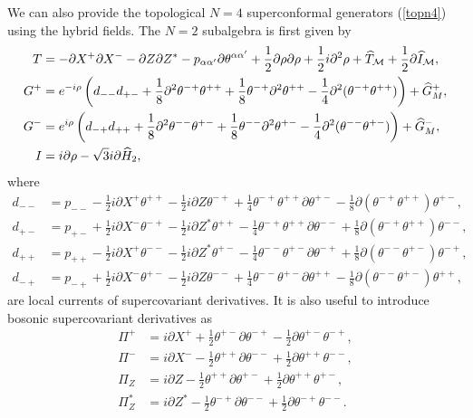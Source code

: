 \documentclass[a4paper,seceq,preprint]{ptptex}
\begin{document}
We can also provide the topological $N=4$ superconformal generators 
(\ref{topn4}) using the hybrid fields. 
The $N=2$ subalgebra is first given by 
\begin{align}
  T&=-\partial X^+\partial X^-
-\partial Z\partial Z^*
-p_{\alpha\alpha'}\partial\theta^{\alpha\alpha'}
+\frac{1}{2}\partial\rho\partial\rho
+\frac{1}{2}i\partial^2\rho
+\widehat T_{\cal M}
+\frac{1}{2}\partial \widehat I_{\cal M},\nonumber\\
G^+&=e^{-i\rho}\left(
d_{--}d_{+-}
+\frac{1}{8}\partial^2\theta^{-+}\theta^{++}
+\frac{1}{8}\theta^{-+}\partial^2\theta^{++}
-\frac{1}{4}\partial^2(\theta^{-+}\theta^{++})\right)
+\widehat G^+_M,\nonumber\\
G^-&=e^{i\rho}\left(
d_{-+}d_{++}+\frac{1}{8}\partial^2\theta^{--}\theta^{+-}
+\frac{1}{8}\theta^{--}\partial^2\theta^{+-}
-\frac{1}{4}\partial^2(\theta^{--}\theta^{+-})\right)
+\widehat G^-_M,\nonumber\\
I&=i\partial\rho-\sqrt{3}i\partial\widehat H_2,\label{uone}
\end{align}
where
\begin{align}
 d_{--}&=p_{--}-\frac{1}{2}i\partial X^+\theta^{++}
-\frac{1}{2}i\partial Z\theta^{-+}
+\frac{1}{4}\theta^{-+}\theta^{++}\partial\theta^{+-}
-\frac{1}{8}\partial(\theta^{-+}\theta^{++})\theta^{+-},
\nonumber\\
 d_{+-}&=p_{+-}+\frac{1}{2}i\partial X^-\theta^{-+}
-\frac{1}{2}i\partial Z^*\theta^{++}
-\frac{1}{4}\theta^{-+}\theta^{++}\partial\theta^{--}
+\frac{1}{8}\partial(\theta^{-+}\theta^{++})\theta^{--},
\nonumber\\
 d_{++}&=p_{++}-\frac{1}{2}i\partial X^+\theta^{--}
-\frac{1}{2}i\partial Z^*\theta^{+-}
-\frac{1}{4}\theta^{--}\theta^{+-}\partial\theta^{-+}
+\frac{1}{8}\partial(\theta^{--}\theta^{+-})\theta^{-+},
\nonumber\\
 d_{-+}&=p_{-+}+\frac{1}{2}i\partial X^-\theta^{+-}
-\frac{1}{2}i\partial Z\theta^{--}
+\frac{1}{4}\theta^{--}\theta^{+-}\partial\theta^{++}
-\frac{1}{8}\partial(\theta^{--}\theta^{+-})\theta^{++},
\label{scd}
\end{align}
are local currents of supercovariant derivatives.
It is also useful to introduce bosonic supercovariant
derivatives as
\begin{align}
 \Pi^+&=i\partial X^++\frac{1}{2}\theta^{+-}\partial\theta^{-+}
-\frac{1}{2}\partial\theta^{+-}\theta^{-+},\nonumber\\
 \Pi^-&=i\partial X^--\frac{1}{2}\theta^{++}\partial\theta^{--}
+\frac{1}{2}\partial\theta^{++}\theta^{--},\nonumber\\
 \Pi_Z&=i\partial Z-\frac{1}{2}\theta^{++}\partial\theta^{+-}
+\frac{1}{2}\partial\theta^{++}\theta^{+-},\nonumber\\
 \Pi^*_Z&=i\partial Z^*-\frac{1}{2}\theta^{-+}\partial\theta^{--}
+\frac{1}{2}\partial\theta^{-+}\theta^{--}.\label{scmom}
\end{align}
\end{document}
